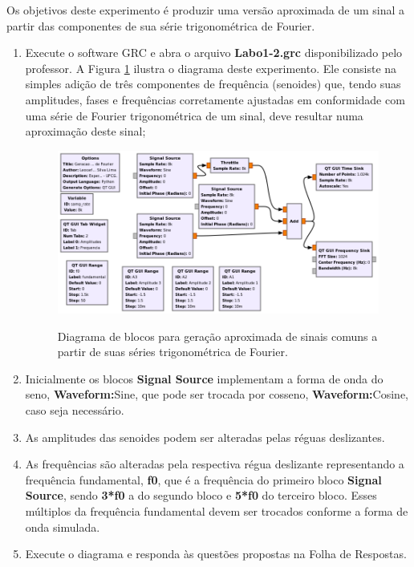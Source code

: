 \documentclass[12pt,addpoints]{exam}
\newcommand{\myscale}{0.4}
\begin{document}
Os objetivos deste experimento é produzir uma versão aproximada de um sinal a partir das componentes de sua série trigonométrica de Fourier.

\begin{enumerate}
    \item Execute o software GRC e abra o arquivo \textbf{Labo1-2.grc} disponibilizado pelo professor. A Figura \ref{fig:GRC_1-2} ilustra o diagrama deste experimento. Ele consiste na simples adição de três componentes de frequência (senoides) que, tendo suas amplitudes, fases e frequências corretamente ajustadas em conformidade com uma série de Fourier trigonométrica de um sinal, deve resultar numa aproximação deste sinal;
    \begin{figure}[htb]
        \centering
        \includegraphics[scale=\myscale]{./Figuras/GRC_1-2a} \\
        \caption{Diagrama de blocos para geração aproximada de sinais comuns a partir de suas séries trigonométrica de Fourier.} 
        \label{fig:GRC_1-2}
    \end{figure}
    \item Inicialmente os blocos \textbf{Signal Source} implementam a forma de onda do seno, \textbf{Waveform:}Sine, que pode ser trocada por cosseno, \textbf{Waveform:}Cosine, caso seja necessário.
    \item As amplitudes das senoides podem ser alteradas pelas réguas deslizantes.
    \item As frequências são alteradas pela respectiva régua deslizante  representando a frequência fundamental, \textbf{f0}, que é a frequência do primeiro bloco \textbf{Signal Source}, sendo \textbf{3*f0} a do segundo bloco e \textbf{5*f0} do terceiro bloco. Esses múltiplos da frequência fundamental devem ser trocados conforme a forma de onda simulada.
    \item Execute o diagrama e responda às questões propostas na Folha de Respostas.
\end{enumerate}
\end{document}
